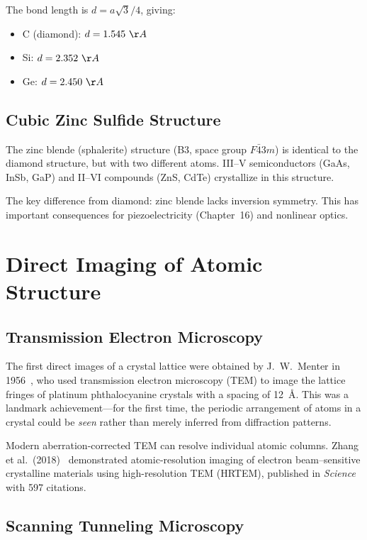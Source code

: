 The bond length is $d = a\sqrt{3}/4$, giving:
\begin{itemize}[nosep]
  \item C (diamond): $d = 1.545~\AA{}$
  \item Si: $d = 2.352~\AA{}$
  \item Ge: $d = 2.450~\AA{}$
\end{itemize}

\subsection{Cubic Zinc Sulfide Structure}

The zinc blende (sphalerite) structure (B3, space group $F\bar{4}3m$) is identical to the diamond structure, but with two different atoms. III--V semiconductors (GaAs, InSb, GaP) and II--VI compounds (ZnS, CdTe) crystallize in this structure.

The key difference from diamond: zinc blende lacks inversion symmetry. This has important consequences for piezoelectricity (Chapter~16) and nonlinear optics.


\section{Direct Imaging of Atomic Structure}

\subsection{Transmission Electron Microscopy}

The first direct images of a crystal lattice were obtained by J.~W.~Menter in 1956~\cite{menter1956direct}, who used transmission electron microscopy (TEM) to image the lattice fringes of platinum phthalocyanine crystals with a spacing of 12~\AA{}. This was a landmark achievement---for the first time, the periodic arrangement of atoms in a crystal could be \textit{seen} rather than merely inferred from diffraction patterns.

Modern aberration-corrected TEM can resolve individual atomic columns. Zhang et al.\ (2018)~\cite{zhang2018atomic} demonstrated atomic-resolution imaging of electron beam--sensitive crystalline materials using high-resolution TEM (HRTEM), published in \textit{Science} with 597 citations.

\subsection{Scanning Tunneling Microscopy}

